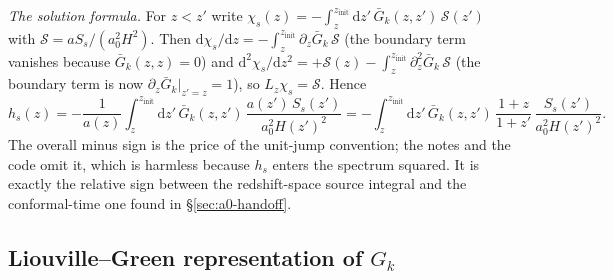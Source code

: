 \documentclass[11pt,a4paper]{article}
\newcommand{\dd}{\mathrm{d}}
\newcommand{\Gb}{\bar{G}}
\newcommand{\zinit}{z_{\mathrm{init}}}
\theoremstyle{remark}
\begin{document}
\emph{The solution formula.} For $z<z'$ write $\chi_s(z) = -\int_z^{\zinit}\dd z'\,\Gb_k(z,z')\,\mathcal{S}(z')$ with $\mathcal{S} = aS_s/(a_0^2H^2)$. Then $\dd\chi_s/\dd z = -\int_z^{\zinit}\partial_z\Gb_k\,\mathcal{S}$ (the boundary term vanishes because $\Gb_k(z,z)=0$) and $\dd^2\chi_s/\dd z^2 = +\mathcal{S}(z) - \int_z^{\zinit}\partial_z^2\Gb_k\,\mathcal{S}$ (the boundary term is now $\partial_z\Gb_k|_{z'=z} = 1$), so $L_z\chi_s = \mathcal{S}$. Hence
\begin{equation}
h_s(z) = -\frac{1}{a(z)}\int_z^{\zinit}\dd z'\,\Gb_k(z,z')\,\frac{a(z')\,S_s(z')}{a_0^2H(z')^2}
= -\int_z^{\zinit}\dd z'\,\Gb_k(z,z')\,\frac{1+z}{1+z'}\,\frac{S_s(z')}{a_0^2H(z')^2}.
\label{eq:hs-redshift}
\end{equation}
The overall minus sign is the price of the unit-jump convention; the notes and the code omit it, which is harmless because $h_s$ enters the spectrum squared. It is exactly the relative sign between the redshift-space source integral and the conformal-time one found in \S\ref{sec:a0-handoff}.

\subsection{Liouville--Green representation of \texorpdfstring{$G_k$}{Gk}}
\label{sec:Gk-LG}
\end{document}
